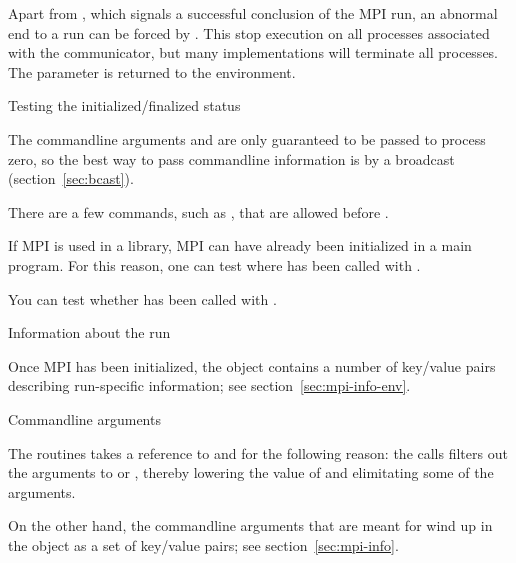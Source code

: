 Apart from , which signals a successful
conclusion of the MPI run, an abnormal end to a run can be forced by
.
%
This stop execution on all processes associated with the communicator,
but many implementations will terminate all processes. The  parameter
is returned to the environment.


 {Testing the initialized/finalized status}

The commandline arguments  and  are only guaranteed to
be passed to process zero, so the best way to pass commandline information
is by a broadcast (section~\ref{sec:bcast}).

There are a few commands, such as
, that are allowed before
.

If MPI is used in a library, MPI can have already been initialized in a main program.
For this reason, one can test where  has been called with
%
.

You can test whether  has been called with
%
.

 {Information about the run}

Once MPI has been initialized, the  object
contains a number of key/value pairs describing run-specific
information; see section~\ref{sec:mpi-info-env}.

 {Commandline arguments}

The  routines takes a reference to 
and  for the following reason: the  calls
filters out the arguments to  or ,
thereby lowering the value of  and elimitating some of the 
arguments.

On the other hand, the commandline arguments that are meant for 
wind up in the  object as a set of
key/value pairs; see section~\ref{sec:mpi-info}.

